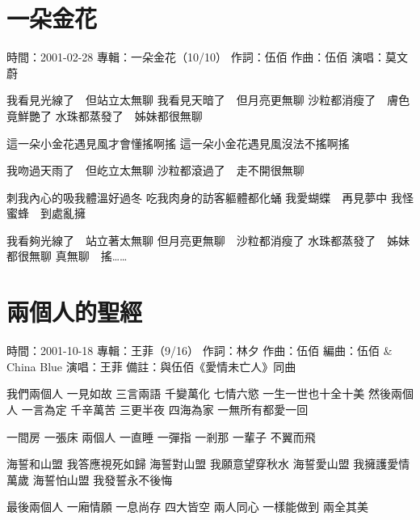 \documentclass[UTF8,a4paper,oneside,twocolumn,12pt]{ctexbook}
\newcommand{\infopair}[2]{\textbullet #1：#2}
\newcommand{\zc}[1][伍佰]{\infopair{作詞}{#1}}
\newcommand{\zq}[1][伍佰]{\infopair{作曲}{#1}}
\newcommand{\bq}[1][伍佰]{\infopair{編曲}{#1}}
\newcommand{\zj}[1]{\infopair{專輯}{#1}}
\newcommand{\sj}[1]{\infopair{時間}{#1}}
\newcommand{\bz}[1]{\infopair{備註}{#1}}
\newenvironment{info}{\begin{flushleft}\kaishu
	}
	{\end{flushleft}\normalsize\yahei\par}
\newenvironment{lyric}{
	}
{}
\begin{document}
\section{一朵金花}
\begin{info}
	\sj{2001-02-28}
	\zj{一朵金花（10/10）}
	\zc
	\zq
	\infopair{演唱}{莫文蔚}
\end{info}
\begin{lyric}
	我看見光線了　但站立太無聊
	我看見天暗了　但月亮更無聊
	沙粒都消瘦了　膚色竟鮮艷了
	水珠都蒸發了　姊妹都很無聊

	這一朵小金花遇見風才會懂搖啊搖
	這一朵小金花遇見風沒法不搖啊搖

	我吻過天雨了　但屹立太無聊
	沙粒都滾過了　走不開很無聊

	刺我內心的吸我體溫好過冬
	吃我肉身的訪客軀體都化蛹
	我愛蝴蝶　再見夢中
	我怪蜜蜂　到處亂擁

	我看夠光線了　站立著太無聊
	但月亮更無聊　沙粒都消瘦了
	水珠都蒸發了　姊妹都很無聊
	真無聊　搖……
\end{lyric}

\section{兩個人的聖經}
\begin{info}
	\sj{2001-10-18}
	\zj{王菲（9/16）}
	\zc[林夕]
	\zq
	\bq[伍佰 \& China Blue]
	\infopair{演唱}{王菲}
	\bz{與伍佰《愛情未亡人》同曲}
\end{info}
\begin{lyric}
	我們兩個人 一見如故 三言兩語
	千變萬化 七情六慾 一生一世也十全十美
	然後兩個人 一言為定 千辛萬苦
	三更半夜 四海為家 一無所有都愛一回

	一間房 一張床 兩個人 一直睡
	一彈指 一剎那 一輩子 不翼而飛

	海誓和山盟 我答應視死如歸
	海誓對山盟 我願意望穿秋水
	海誓愛山盟 我擁護愛情萬歲
	海誓怕山盟 我發誓永不後悔

	最後兩個人 一廂情願 一息尚存
	四大皆空 兩人同心 一樣能做到 兩全其美
\end{lyric}
\end{document}
